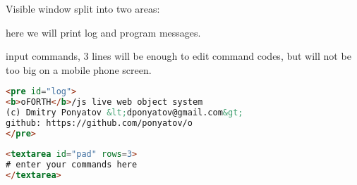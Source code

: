 \pg Visible window split into two areas:
\begin{description}[nosep]
\item[log] here we will print log and program messages.
\item[pad] input commands, 3 lines will be enough to edit command codes, but
will not be too big on a mobile phone screen.
\end{description}
\begin{lstlisting}[language=html]
<pre id="log">
<b>oFORTH</b>/js live web object system
(c) Dmitry Ponyatov &lt;dponyatov@gmail.com&gt;
github: https://github.com/ponyatov/o
</pre>
\end{lstlisting}
\begin{lstlisting}[language=html]
<textarea id="pad" rows=3>
# enter your commands here
</textarea>
\end{lstlisting}

\secup
